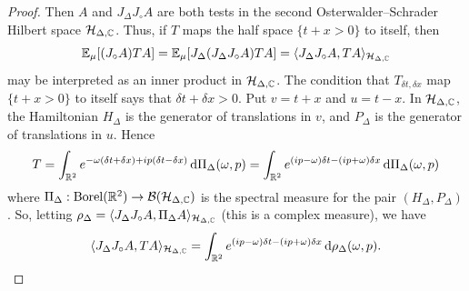 \begin{proof}
    Then $A$ and $J_\Delta J_\circ A$ are both tests in the  second Osterwalder--Schrader Hilbert space $\mathcal{H}_{\Delta,\mathbb{C}}$. Thus, if $T$ maps the half space $\{t+x>0\}$ to itself, then
    \begin{equation}
        \mathbb{E}_\mu[(J_\circ A)T A ] =\mathbb{E}_\mu[J_\Delta (J_\Delta J_\circ A)T A ] = \langle J_\Delta J_\circ A,TA \rangle_{\mathcal{H}_{\Delta,\mathbb{C}}}
    \end{equation}
    may be interpreted as an inner product in $\mathcal{H}_{\Delta,\mathbb{C}}$. 
    The condition that $T_{\delta t,\delta x}$ map $\{t+x>0\}$ to itself says that $\delta t+\delta x>0$. Put $v=t+x$ and $u=t-x$. 
    In $\mathcal{H}_{\Delta,\mathbb{C}}$, the Hamiltonian $H_\Delta$ is the generator of translations in $v$, and $P_\Delta$ is the generator of translations in $u$. Hence 
    \begin{equation}
        T = \int_{\mathbb{R}^2} e^{- \omega (\delta t+\delta x) + i p (\delta t-\delta x)} \,\mathrm{d} \Pi_\Delta(\omega,p) = \int_{\mathbb{R}^2} e^{ (ip-\omega) \delta t - (ip+\omega) \delta x} \,\mathrm{d} \Pi_\Delta(\omega ,p) 
    \end{equation}
    where $\Pi_\Delta:\operatorname{Borel}(\mathbb{R}^2)\to \mathcal{B}(\mathcal{H}_{\Delta,\mathbb{C}})$ is the spectral measure for the pair $(H_\Delta,P_\Delta)$. So, letting $\rho_\Delta = \langle J_\Delta J_\circ A, \Pi_\Delta A \rangle_{\mathcal{H}_{\Delta,\mathbb{C}}}$
    (this is a complex measure), we have 
    \begin{equation}
        \langle J_\Delta J_\circ A,TA \rangle_{\mathcal{H}_{\Delta,\mathbb{C}}} = \int_{\mathbb{R}^2} e^{(ip-\omega) \delta t - (ip+\omega) \delta x} \,\mathrm{d} \rho_\Delta(\omega,p)  .
    \end{equation}


\end{proof}
